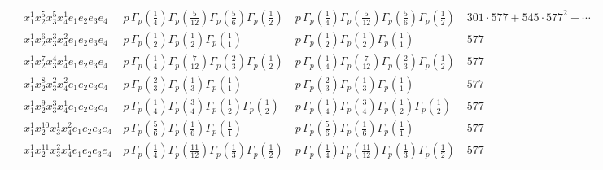 \documentclass[11pt]{article}
\begin{document}
\begin{table}[ht]
{\begin{tabular}{@{}lllll@{}}
 & $x_{1}^{1} x_{2}^{5} x_{3}^{5} x_{4}^{1}  e_{1} e_{2} e_{3} e_{4}$ & $p \, \Gamma_p \left( \frac{1}{4} \right) \Gamma_p \left( \frac{5}{12} \right) \Gamma_p \left( \frac{5}{6} \right) \Gamma_p \left( \frac{1}{2} \right)$ & $p \, \Gamma_p \left( \frac{1}{4} \right) \Gamma_p \left( \frac{5}{12} \right) \Gamma_p \left( \frac{5}{6} \right) \Gamma_p \left( \frac{1}{2} \right)$ & $301{\cdot}577{+}545{\cdot}577^{2}{+}\cdots$ \\
 & $x_{1}^{1} x_{2}^{6} x_{3}^{3} x_{4}^{2}  e_{1} e_{2} e_{3} e_{4}$ & $p \, \Gamma_p \left( \frac{1}{2} \right) \Gamma_p \left( \frac{1}{2} \right) \Gamma_p \left( \frac{1}{1} \right)$ & $p \, \Gamma_p \left( \frac{1}{2} \right) \Gamma_p \left( \frac{1}{2} \right) \Gamma_p \left( \frac{1}{1} \right)$ & $577$ \\
 & $x_{1}^{1} x_{2}^{7} x_{3}^{4} x_{4}^{1}  e_{1} e_{2} e_{3} e_{4}$ & $p \, \Gamma_p \left( \frac{1}{4} \right) \Gamma_p \left( \frac{7}{12} \right) \Gamma_p \left( \frac{2}{3} \right) \Gamma_p \left( \frac{1}{2} \right)$ & $p \, \Gamma_p \left( \frac{1}{4} \right) \Gamma_p \left( \frac{7}{12} \right) \Gamma_p \left( \frac{2}{3} \right) \Gamma_p \left( \frac{1}{2} \right)$ & $577$ \\
 & $x_{1}^{1} x_{2}^{8} x_{3}^{2} x_{4}^{2}  e_{1} e_{2} e_{3} e_{4}$ & $p \, \Gamma_p \left( \frac{2}{3} \right) \Gamma_p \left( \frac{1}{3} \right) \Gamma_p \left( \frac{1}{1} \right)$ & $p \, \Gamma_p \left( \frac{2}{3} \right) \Gamma_p \left( \frac{1}{3} \right) \Gamma_p \left( \frac{1}{1} \right)$ & $577$ \\
 & $x_{1}^{1} x_{2}^{9} x_{3}^{3} x_{4}^{1}  e_{1} e_{2} e_{3} e_{4}$ & $p \, \Gamma_p \left( \frac{1}{4} \right) \Gamma_p \left( \frac{3}{4} \right) \Gamma_p \left( \frac{1}{2} \right) \Gamma_p \left( \frac{1}{2} \right)$ & $p \, \Gamma_p \left( \frac{1}{4} \right) \Gamma_p \left( \frac{3}{4} \right) \Gamma_p \left( \frac{1}{2} \right) \Gamma_p \left( \frac{1}{2} \right)$ & $577$ \\
 & $x_{1}^{1} x_{2}^{10} x_{3}^{1} x_{4}^{2}  e_{1} e_{2} e_{3} e_{4}$ & $p \, \Gamma_p \left( \frac{5}{6} \right) \Gamma_p \left( \frac{1}{6} \right) \Gamma_p \left( \frac{1}{1} \right)$ & $p \, \Gamma_p \left( \frac{5}{6} \right) \Gamma_p \left( \frac{1}{6} \right) \Gamma_p \left( \frac{1}{1} \right)$ & $577$ \\
 & $x_{1}^{1} x_{2}^{11} x_{3}^{2} x_{4}^{1}  e_{1} e_{2} e_{3} e_{4}$ & $p \, \Gamma_p \left( \frac{1}{4} \right) \Gamma_p \left( \frac{11}{12} \right) \Gamma_p \left( \frac{1}{3} \right) \Gamma_p \left( \frac{1}{2} \right)$ & $p \, \Gamma_p \left( \frac{1}{4} \right) \Gamma_p \left( \frac{11}{12} \right) \Gamma_p \left( \frac{1}{3} \right) \Gamma_p \left( \frac{1}{2} \right)$ & $577$ \\

\end{tabular}}
\end{table}
\end{document}
